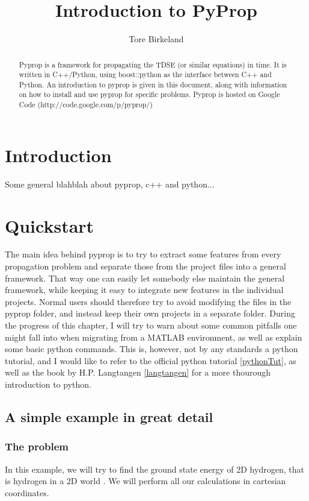 \documentclass[a4paper,12pt]{report}
\title{Introduction to PyProp}
\author{Tore Birkeland}
\begin{document}
\maketitle

\begin{abstract}
Pyprop is a framework for propagating the TDSE (or similar equations) in time. It is written in
C++/Python, using boost::python as the interface between C++ and Python. An introduction to pyprop 
is given in this document, along with information on how to install and use pyprop for
specific problems. Pyprop is hosted on Google Code (http://code.google.com/p/pyprop/)
\end{abstract}

\chapter{Introduction}
Some general blahblah about pyprop, c++ and python...



\chapter{Quickstart}
The main idea behind pyprop is to try to extract some features from every propagation problem and 
separate those from the project files into a general framework. 
That way one can easily let somebody else maintain the general framework, while keeping it easy to
integrate new features in the individual projects. Normal users should therefore try to avoid
modifying the files in the pyprop folder, and instead keep their own projects in a separate folder. 
During the progress of this chapter, I will try to warn about some common pitfalls one might fall into
when migrating from a MATLAB environment, as well as explain some basic python commands. This is, however, 
not by any standards a python tutorial, and I would like to refer to the official python tutorial \ref{pythonTut},
as well as the book by H.P. Langtangen \ref{langtangen} for a more thourough introduction to python.

\section{A simple example in great detail}
\subsection{The problem}
In this example, we will try to find the ground state energy of 2D hydrogen, that is hydrogen in
a 2D world \cite[p.12]{leneray}. We will perform all our calculations in cartesian coordinates.
\end{document}
